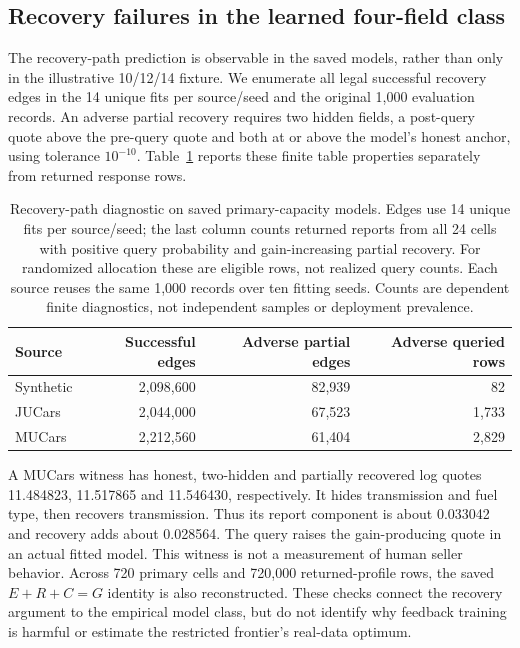 \documentclass[11pt]{article}
\begin{document}
\subsection{Recovery failures in the learned four-field class}\label{sec:empirical_recovery}
The recovery-path prediction is observable in the saved models, rather than
only in the illustrative 10/12/14 fixture. We enumerate all legal successful
recovery edges in the 14 unique fits per source/seed and the original 1,000
evaluation records. An adverse partial recovery requires two hidden fields,
a post-query quote above the pre-query quote and both at or above the model's
honest anchor, using tolerance $10^{-10}$. Table~\ref{tab:recovery_diagnostic}
reports these finite table properties separately from returned response rows.
\begin{table}[htbp]\centering\small
\begin{tabular}{lrrr}\toprule
Source & Successful edges & Adverse partial edges & Adverse queried rows\\\midrule
Synthetic & 2,098,600 & 82,939 & 82 \\
JUCars & 2,044,000 & 67,523 & 1,733 \\
MUCars & 2,212,560 & 61,404 & 2,829 \\
\bottomrule\end{tabular}
\caption{Recovery-path diagnostic on saved primary-capacity models. Edges use
14 unique fits per source/seed; the last column counts returned reports from
all 24 cells with positive query probability and gain-increasing partial recovery.
For randomized allocation these are eligible rows, not realized query counts.
Each source reuses the same 1,000 records over ten fitting seeds. Counts are
dependent finite diagnostics, not independent samples or deployment prevalence.}
\label{tab:recovery_diagnostic}\end{table}

A MUCars witness has honest, two-hidden and partially recovered log quotes
11.484823, 11.517865 and 11.546430, respectively. It hides transmission and
fuel type, then recovers transmission. Thus its report component is about
0.033042 and recovery adds about 0.028564. The query raises the gain-producing
quote in an actual fitted model. This witness is not a measurement of human
seller behavior. Across 720 primary cells and 720,000 returned-profile rows,
the saved $E+R+C=G$ identity is also reconstructed. These checks connect the
recovery argument to the empirical model class, but do not identify why
feedback training is harmful or estimate the restricted frontier's real-data
optimum.
\end{document}
